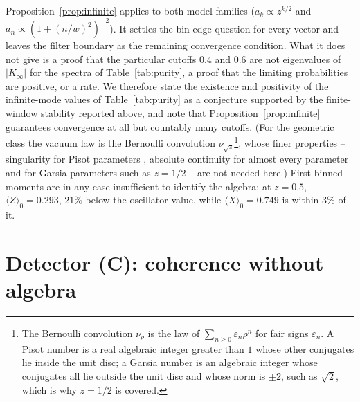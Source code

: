 \documentclass[11pt,a4paper]{article}
\begin{document}
Proposition~\ref{prop:infinite} applies to both model families ($a_k\propto z^{k/2}$ and $a_n\propto(1+(n/w)^2)^{-2}$). It settles the bin-edge question for every vector and leaves the filter boundary as the remaining convergence condition. What it does not give is a proof that the particular cutoffs $0.4$ and $0.6$ are not eigenvalues of $|K_\infty|$ for the spectra of Table~\ref{tab:purity}, a proof that the limiting probabilities are positive, or a rate. We therefore state the existence and positivity of the infinite-mode values of Table~\ref{tab:purity} as a conjecture supported by the finite-window stability reported above, and note that Proposition~\ref{prop:infinite} guarantees convergence at all but countably many cutoffs. (For the geometric class the vacuum law is the Bernoulli convolution $\nu_{\sqrt z}$\footnote{The Bernoulli convolution $\nu_\rho$ is the law of $\sum_{n\ge0}\varepsilon_n\rho^n$ for fair signs $\varepsilon_n$. A Pisot number is a real algebraic integer greater than $1$ whose other conjugates lie inside the unit disc; a Garsia number is an algebraic integer whose conjugates all lie outside the unit disc and whose norm is $\pm2$, such as $\sqrt2$, which is why $z=1/2$ is covered.}, whose finer properties -- singularity for Pisot parameters \cite{Erdos1939}, absolute continuity for almost every parameter \cite{Solomyak1995,Shmerkin2014} and for Garsia parameters such as $z=1/2$ \cite{Garsia1962} -- are not needed here.) First binned moments are in any case insufficient to identify the algebra: at $z=0.5$, $\langle Z\rangle_0=0.293$, $21\%$ below the oscillator value, while $\langle X\rangle_0=0.749$ is within $3\%$ of it.

\section{Detector (C): coherence without algebra}
\label{sec:initial}
\end{document}
